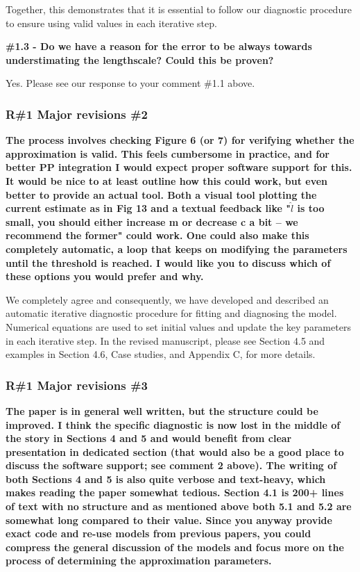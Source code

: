 \documentclass[11pt]{report}
\begin{document}
Together, this demonstrates that it is essential to follow our diagnostic procedure to ensure using valid values in each iterative step.

\textbf{\#1.3 - Do we have a reason for the error to be always towards understimating the lengthscale? Could this be proven?}

Yes. Please see our response to your comment \#1.1 above.


\subsubsection*{R\#1 Major revisions \#2}

\textbf{The process involves checking Figure 6 (or 7) for verifying whether the approximation is valid. This feels cumbersome in practice, and for better PP integration I would expect proper software support for this. It would be nice to at least outline how this could work, but even better to provide an actual tool. Both a visual tool plotting the current estimate as in Fig 13 and a textual feedback like "$\hat l$ is too small, you should either increase m or decrease c a bit -- we recommend the former" could work. One could also make this completely automatic, a loop that keeps on modifying the parameters until the threshold is reached. I would like you to discuss which of these options you would prefer and why.}


We completely agree and consequently, we have developed and described an automatic iterative diagnostic procedure for fitting and diagnosing the model. Numerical equations are used to set initial values and update the key parameters in each iterative step.
In the revised manuscript, please see Section 4.5 and examples in Section 4.6, Case studies, and Appendix C, for more details.

\subsubsection*{R\#1 Major revisions \#3}

\textbf{The paper is in general well written, but the structure could be improved. I think the specific diagnostic is now lost in the middle of the story in Sections 4 and 5 and would benefit from clear presentation in dedicated section (that would also be a good place to discuss the software support; see comment 2 above). The writing of both Sections 4 and 5 is also quite verbose and text-heavy, which makes reading the paper somewhat tedious. Section 4.1 is 200+ lines of text with no structure and as mentioned above both 5.1 and 5.2 are somewhat long compared to their value. Since you anyway provide exact code and re-use models from previous papers, you could compress the general discussion of the models and focus more on the process of determining the approximation parameters.}
\end{document}
